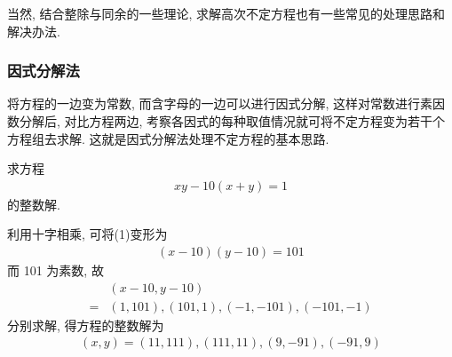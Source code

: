 当然, 结合整除与同余的一些理论, 求解高次不定方程也有一些常见的处理思路和解决办法.

\subsubsection{因式分解法}
将方程的一边变为常数, 而含字母的一边可以进行因式分解, 这样对常数进行素因数分解后, 对比方程两边, 考察各因式的每种取值情况就可将不定方程变为若干个方程组去求解. 这就是因式分解法处理不定方程的基本思路.

\begin{example}
	求方程
	\begin{align*}
		x y-10(x+y)=1
	\end{align*}
	的整数解.
\end{example}
\begin{solution}
	利用十字相乘, 可将(1)变形为
	\begin{align*}
		(x-10)(y-10)=101
	\end{align*}
	而 101 为素数, 故\begin{align}
		  & (x-10, y-10)                        \\
		= & (1,101),(101,1),(-1,-101),(-101,-1)
	\end{align}
	分别求解, 得方程的整数解为
	\begin{align*}
		(x, y)=(11,111),(111,11),(9,-91),(-91,9)
	\end{align*}
\end{solution}

